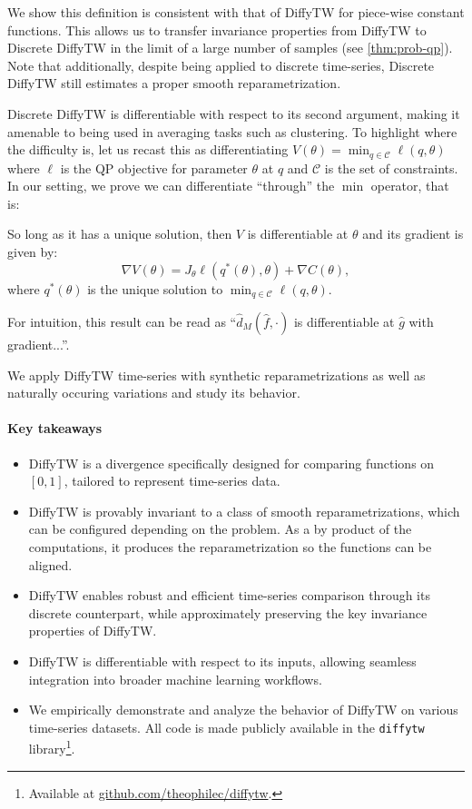 We show this definition is consistent with that of DiffyTW for piece-wise constant functions. This allows us to transfer invariance properties from DiffyTW to Discrete DiffyTW in the limit of a large number of samples (see \cref{thm:prob-qp}). Note that additionally, despite being applied to discrete time-series, Discrete DiffyTW still estimates a proper smooth reparametrization.

Discrete DiffyTW is differentiable with respect to its second argument, making it amenable to being used in averaging tasks such as clustering. To highlight where the difficulty is, let us recast this as differentiating $V(\theta) = \min_{q\in\mathcal C}\ell(q, \theta)$ where $\ell$ is the QP objective for parameter $\theta$ at $q$ and $\mathcal C$ is the set of constraints. In our setting, we prove we can differentiate ``through'' the $\min$ operator, that is:
\begin{mdframed}
\begin{informaltheorem}
So long as it has a unique solution, then $V$ is differentiable at $\theta$ and its gradient is given by:
    \begin{equation}
        \nabla V(\theta) = J_\theta \ell(q^*(\theta), \theta) + \nabla C(\theta),
    \end{equation} where $q^*(\theta)$ is the unique solution to $\min_{q\in\mathcal C}\ell(q, \theta)$.
\end{informaltheorem}
\end{mdframed}
For intuition, this result can be read as ``$\hat d_M(\hat f, \cdot)$ is differentiable at $\hat g$ with gradient...''.

We apply DiffyTW time-series with synthetic reparametrizations as well as naturally occuring variations and study its behavior.

\paragraph{Key takeaways}
\begin{itemize}
    \item DiffyTW is a divergence specifically designed for comparing functions on $[0,1]$, tailored to represent time-series data.
    \item DiffyTW is provably invariant to a class of smooth reparametrizations, which can be configured depending on the problem. As a by product of the computations, it produces the reparametrization so the functions can be aligned.
    \item DiffyTW enables robust and efficient time-series comparison through its discrete counterpart, while approximately preserving the key invariance properties of DiffyTW.
    \item DiffyTW is differentiable with respect to its inputs, allowing seamless integration into broader machine learning workflows.
    \item We empirically demonstrate and analyze the behavior of DiffyTW on various time-series datasets. All code is made publicly available in the \texttt{diffytw} library\footnote{Available at \url{github.com/theophilec/diffytw}.}.
\end{itemize}

